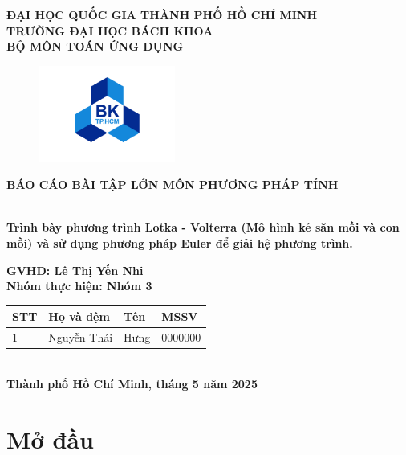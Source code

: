 \documentclass[a4paper,15pt]{article}
\begin{document}
\begin{titlepage}
    \centering
    {\textbf{ĐẠI HỌC QUỐC GIA THÀNH PHỐ HỒ CHÍ MINH} \\   
    {\textbf{TRƯỜNG ĐẠI HỌC BÁCH KHOA}} \\   
    {\textbf{BỘ MÔN TOÁN ỨNG DỤNG}} \\
\begin{figure}[h]
    \centering
    \includegraphics[width=0.4\textwidth]{img/logobachkhoa.png}
\end{figure}
    { \textbf{BÁO CÁO BÀI TẬP LỚN MÔN PHƯƠNG PHÁP TÍNH}} \\
    \hrulefill \\}
    {\huge \textbf{Trình bày phương trình Lotka - Volterra (Mô hình kẻ săn mồi và con mồi) và sử dụng phương pháp Euler để giải hệ phương trình.}} \\
    \vspace{0.5cm}
    
    { \textbf{GVHD: Lê Thị Yến Nhi}} \\
    {\textbf{Nhóm thực hiện: Nhóm 3}}
    \vspace{1cm}

\begin{tabular}{|m{1cm}|m{3cm}|m{3cm}|m{2cm}|}
\hline
STT & Họ và đệm  & Tên &  MSSV \\ \hline
1 & Nguyễn Thái & Hưng & 0000000 \\ \hline
\end{tabular}
\vspace{6cm} \\
\textbf{Thành phố Hồ Chí Minh, tháng 5 năm 2025}
\end{titlepage}

\tableofcontents
\newpage

\section{Mở đầu}
\end{document}

